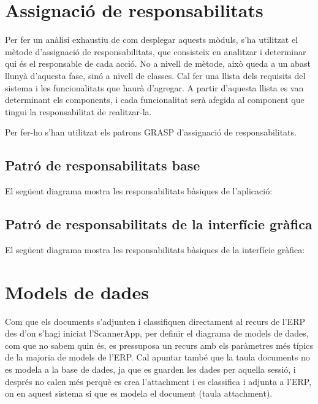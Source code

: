 \documentclass[letterpaper,11pt,catalan]{sphinxmanual}
\begin{document}


\section{Assignació de responsabilitats}
\label{\detokenize{index:assignacio-de-responsabilitats}}
Per fer un anàlisi exhaustiu de com desplegar aquests mòduls, s'ha utilitzat el mètode d'assignació de
responsabilitats, que consisteix en analitzar i determinar qui és el responsable de cada
acció. No a nivell de mètode, això queda a un abast llunyà d'aquesta fase, sinó a nivell
de classes. Cal fer una llista dels requisits del sistema i les funcionalitats que haurà
d'agregar. A partir d'aquesta llista es van determinant els components, i cada funcionalitat
serà afegida al component que tingui la responsabilitat de realitzar-la.

Per fer-ho s'han utilitzat els patrons GRASP d'assignació de responsabilitats.


\subsection{Patró de responsabilitats base}
\label{\detokenize{index:patro-de-responsabilitats-base}}
El següent diagrama mostra les responsabilitats bàsiques de l'aplicació:



\subsection{Patró de responsabilitats de la interfície gràfica}
\label{\detokenize{index:patro-de-responsabilitats-de-la-interficie-grafica}}
El següent diagrama mostra les responsabilitats bàsiques de la interfície gràfica:



\section{Models de dades}
\label{\detokenize{index:models-de-dades}}
Com que els documents s'adjunten i classifiquen directament al recurs de l'ERP des d'on s'hagi iniciat l'ScannerApp, per definir el diagrama de models de dades, com que no sabem quin és, es pressuposa un recurs amb els paràmetres més típics de la majoria de models de l'ERP. Cal apuntar també que la taula documents no es modela a la base de dades, ja que es guarden les dades per aquella sessió, i després no calen més perquè es crea l'attachment i es classifica i adjunta a l'ERP, on en aquest sistema si que es modela el document (taula attachment).
\end{document}
